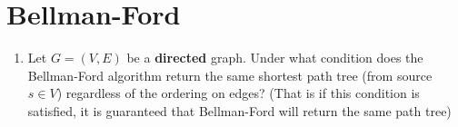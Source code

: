 \documentclass{article}
\begin{document}
    \section{Bellman-Ford}
    \begin{enumerate}
        \item Let $G=(V,E)$ be a \textbf{directed} graph. Under what condition does the Bellman-Ford algorithm return the same shortest path tree (from source $s \in V$) regardless of the ordering on edges? (That is if this condition is satisfied, it is guaranteed that Bellman-Ford will return the same path tree)
    \end{enumerate}
\end{document}
